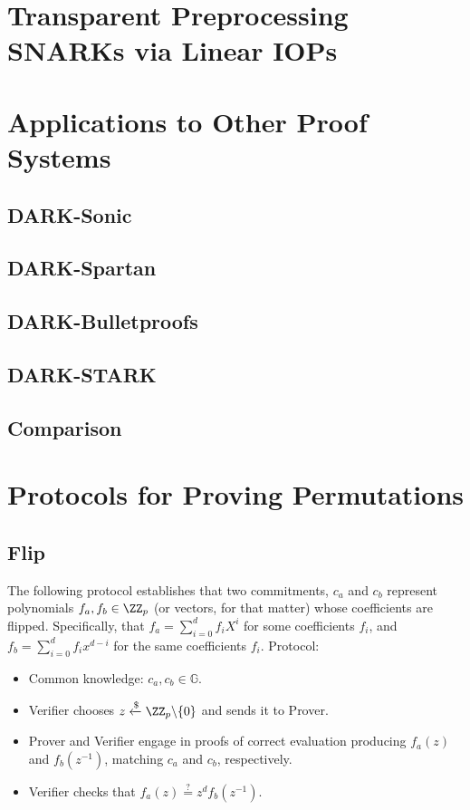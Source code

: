 \documentclass{article}
\theoremstyle{definition}
\begin{document}
\section{Transparent Preprocessing SNARKs via Linear IOPs} 


\section{Applications to Other Proof Systems}

\subsection{DARK-Sonic}

\subsection{DARK-Spartan}

\subsection{DARK-Bulletproofs}

\subsection{DARK-STARK}

\subsection{Comparison}

%

  

\appendix


\section{Protocols for Proving Permutations}


\subsection{Flip}

The following protocol establishes that two commitments, $c_a$ and $c_b$ represent polynomials $f_a, f_b \in \ZZ_p$ (or vectors, for that matter) whose coefficients are flipped. Specifically, that $f_a = \sum_{i=0}^{d}f_i X^i$ for some coefficients $f_i$, and $f_b = \sum_{i=0}^df_ix^{d-i}$ for the same coefficients $f_i$.
Protocol:
\begin{itemize}
    \item Common knowledge: $c_a, c_b \in \mathbb{G}$.
    \item Verifier chooses $z \xleftarrow{\$} \ZZ_p \backslash \{0\}$ and sends it to Prover.
    \item Prover and Verifier engage in proofs of correct evaluation producing $f_a(z)$ and $f_b(z^{-1})$, matching $c_a$ and $c_b$, respectively.
    \item Verifier checks that $f_a(z) \stackrel{?}{=} z^d f_b(z^{-1})$.
\end{itemize}
\end{document}
